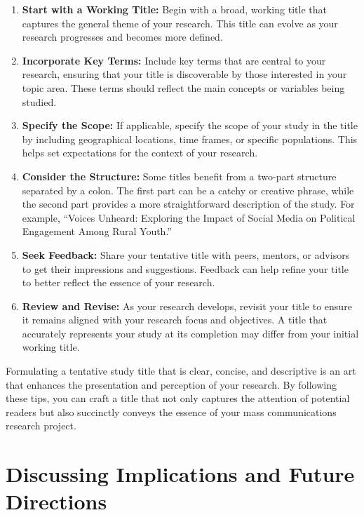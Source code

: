 \documentclass[
]{book}
\begin{document}
\begin{enumerate}
\def\labelenumi{\arabic{enumi}.}
\item
  \textbf{Start with a Working Title:} Begin with a broad, working title that captures the general theme of your research. This title can evolve as your research progresses and becomes more defined.
\item
  \textbf{Incorporate Key Terms:} Include key terms that are central to your research, ensuring that your title is discoverable by those interested in your topic area. These terms should reflect the main concepts or variables being studied.
\item
  \textbf{Specify the Scope:} If applicable, specify the scope of your study in the title by including geographical locations, time frames, or specific populations. This helps set expectations for the context of your research.
\item
  \textbf{Consider the Structure:} Some titles benefit from a two-part structure separated by a colon. The first part can be a catchy or creative phrase, while the second part provides a more straightforward description of the study. For example, ``Voices Unheard: Exploring the Impact of Social Media on Political Engagement Among Rural Youth.''
\item
  \textbf{Seek Feedback:} Share your tentative title with peers, mentors, or advisors to get their impressions and suggestions. Feedback can help refine your title to better reflect the essence of your research.
\item
  \textbf{Review and Revise:} As your research develops, revisit your title to ensure it remains aligned with your research focus and objectives. A title that accurately represents your study at its completion may differ from your initial working title.
\end{enumerate}

Formulating a tentative study title that is clear, concise, and descriptive is an art that enhances the presentation and perception of your research. By following these tips, you can craft a title that not only captures the attention of potential readers but also succinctly conveys the essence of your mass communications research project.

\hypertarget{discussing-implications-and-future-directions}{%
\section{Discussing Implications and Future Directions}\label{discussing-implications-and-future-directions}}
\end{document}

